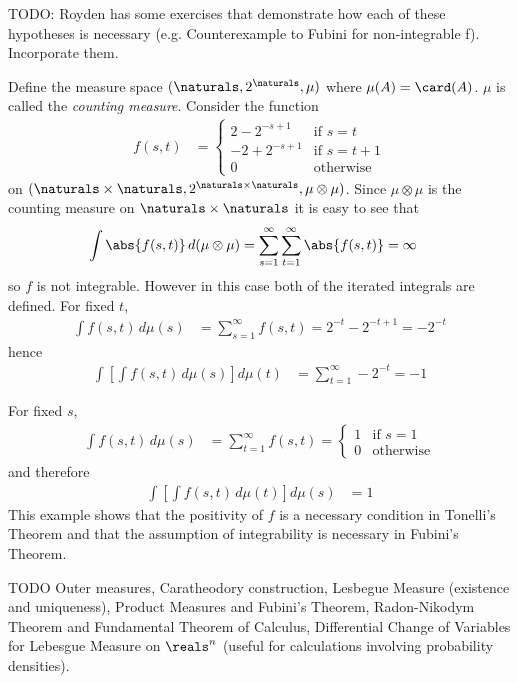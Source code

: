 TODO: Royden has some exercises that demonstrate how each of these
hypotheses is necessary (e.g. Counterexample to Fubini for
non-integrable f).  Incorporate them.
\begin{examp}Define the measure space $(\naturals, 2^\naturals,
  \mu)$ where $\mu(A) = \card(A)$.  $\mu$ is called the \emph{counting
    measure}.  
Consider the function 
\begin{align*}
f(s,t) &= \begin{cases}
2 - 2^{-s+1} & \text{if $s=t$}\\
-2 + 2^{-s+1} & \text{if $s = t + 1$} \\
0 & \text{otherwise}
\end{cases}
\end{align*}
on $(\naturals \times \naturals, 2^{\naturals \times \naturals}, \mu
\otimes \mu)$.  Since $\mu \otimes \mu$ is the counting measure on
$\naturals \times \naturals$ it is easy to see that 
\begin{align*}
\int \abs{f(s,t)} \, d ( \mu \otimes \mu) &= \sum_{s=1}^\infty
\sum_{t=1}^\infty \abs{f(s,t)} = \infty
\end{align*}
so $f$ is not integrable.  However in this case both of the iterated
integrals are defined.
For fixed $t$, 
\begin{align*}
\int f(s,t) \, d\mu(s) &=
\sum_{s=1}^\infty f(s,t) = 2^{-t} - 2^{-t+1} = -2^{-t}
\end{align*}
hence 
\begin{align*}
\int \left [ \int f(s,t) \, d\mu(s) \right ] d \mu(t) &=
\sum_{t=1}^\infty -2^{-t} = -1
\end{align*}

For fixed $s$, 
\begin{align*}
\int f(s,t) \, d\mu(s) &=
\sum_{t=1}^\infty f(s,t) = \begin{cases}
1 & \text {if $s=1$}\\
0 & \text {otherwise}
\end{cases}
\end{align*}
and therefore 
\begin{align*}
\int \left [ \int f(s,t) \, d\mu(t) \right ] d \mu(s) &= 1
\end{align*}
This example shows that the positivity of $f$ is a necessary condition
in Tonelli's Theorem and that the assumption of integrability is
necessary in Fubini's Theorem.
\end{examp}


TODO
Outer measures, Caratheodory construction, Lesbegue Measure (existence
and uniqueness), Product Measures and Fubini's Theorem, Radon-Nikodym Theorem and
Fundamental Theorem of Calculus, Differential Change of Variables for
Lebesgue Measure on $\reals^n$ (useful for calculations involving
probability densities).

